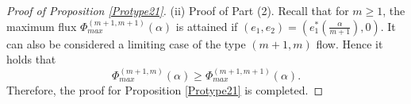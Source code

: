 \documentclass[reqno,12pt]{amsart}
\newtheorem{pro}[theorem]{Proposition}
\begin{document}
{\begin{proof}[Proof of Proposition \ref{Protype21}]
(ii) Proof of Part (2). 
Recall that for $m\geq 1$, the maximum flux $\Phi_{max}^{(m+1, m+1)}(\alpha)$ is attained if $(e_1,e_2)=( e_1^*(\frac{\alpha}{m+1}), 0)$. It can also be considered a limiting case of the type $(m+1, m)$ flow. Hence it holds that 
\begin{equation*}
    \Phi_{max}^{(m+1, m)}(\alpha) \geq \Phi_{max}^{(m+1, m+1)}(\alpha).
\end{equation*}
Therefore, the proof for Proposition \ref{Protype21} is completed. 
\end{proof}
 }
 
\end{document}

